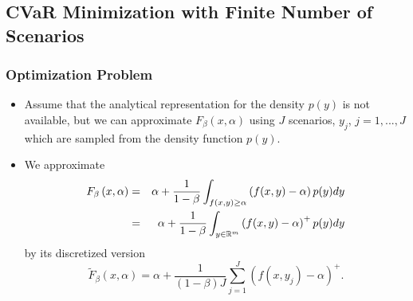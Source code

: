 \documentclass[pdf,9pt,xcolor=dvipsnames,hide notes]{beamer}
\begin{document}
\subsection{CVaR Minimization with Finite Number of Scenarios}
\begin{frame}[label=frame2b7]
	\frametitle{Optimization Problem}
	
		\begin{itemize}
		\justifying
		
		\item Assume that the analytical representation for the density $p(y)$ is not
		available, but we can approximate $F_{\beta }\left( x,\alpha \right) $ using
		$J$ scenarios, $y_{j}$, $j=1,...,J$ which are sampled from the density
		function $p(y)$. 
		
		\vspace{0.3cm}
		
		\item We approximate
		\begin{eqnarray}
		F_{\beta }\left( x,\alpha \right) &=&\alpha +\frac{1}{1-\beta }%
		\int_{f(x,y)\geq \alpha }\left( f(x,y)-\alpha \right) p(y)dy  \notag \\
		&=&\alpha +\frac{1}{1-\beta }\int_{y\in
			\mathbb{R}
			^{m}}\left( f(x,y)-\alpha \right) ^{+}p(y)dy  \label{fb}
		\end{eqnarray}%
		by its discretized version
		\begin{equation*}
		\widetilde{F}_{\beta }\left( x,\alpha \right) =\alpha +\frac{1}{\left(
			1-\beta \right) J}\sum_{j=1}^{J}\left( f(x,y_{j})-\alpha \right) ^{+}.
		\end{equation*}%
				
	\end{itemize}
	
\end{frame}
\end{document}
